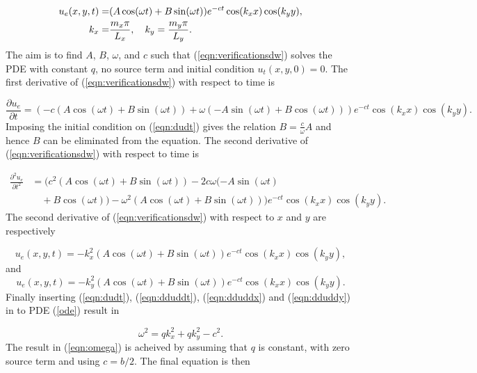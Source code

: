 \documentclass[twoside]{article}
\begin{document}
\begin{align}\label{eqn:verificationsdw} 
 u_e(x, y, t) =& (A\cos(\omega t) + B\sin(\omega t))e^{-ct}\cos(k_x x)\cos(k_y y), \\ \notag
 k_x =& \frac{m_x\pi}{L_x}, \quad k_y=\frac{m_y \pi}{L_y}.
\end{align}
The aim is to find $A$, $B$, $\omega$, and $c$ such that (\ref{eqn:verificationsdw}) solves the PDE with constant $q$, no source term and initial condition $u_t(x,y,0)=0$. The first derivative of (\ref{eqn:verificationsdw}) with respect to time is

\begin{equation}
 \frac{\partial u_e}{\partial t} = (-c(A\cos(\omega t)+B\sin(\omega t)) + \omega (-A\sin(\omega t) + B\cos(\omega t))) e^{-ct} \cos (k_x x) \cos(k_y y).
\label{eqn:dudt}
\end{equation}
Imposing the initial condition on (\ref{eqn:dudt}) gives the relation $B=\frac{c}{\omega}A$ and hence $B$ can be eliminated from the equation. The second derivative of (\ref{eqn:verificationsdw}) with respect to time is

\begin{align}
 \frac{\partial^2 u_e}{\partial t^2} &= (c^2(A\cos(\omega t)+B\sin(\omega t)) - 2 c \omega     (-A\sin(\omega t)\\
         & \quad+ B\cos(\omega t)) - \omega^2 (A\cos (\omega t) + B\sin(\omega t))) e^{-ct} \cos (k_x x) \cos(k_y y).
\label{eqn:dduddt}
\end{align}
The second derivative of (\ref{eqn:verificationsdw}) with respect to $x$ and $y$ are respectively

\begin{equation}
 u_e(x, y, t) = -k_x^2 (A\cos(\omega t) + B\sin(\omega t))e^{-ct}\cos(k_x x)\cos(k_y y),
\label{eqn:dduddx}
\end{equation}
and 
\begin{equation}
 u_e(x, y, t) = -k_y^2(A\cos(\omega t) + B\sin(\omega t))e^{-ct}\cos(k_x x)\cos(k_y y).
\label{eqn:dduddy}
\end{equation}
Finally inserting (\ref{eqn:dudt}), (\ref{eqn:dduddt}), (\ref{eqn:dduddx}) and (\ref{eqn:dduddy}) in to PDE (\ref{ode}) result in

\begin{equation}
 \omega^2 = q k_x^2 + qk_y^2 - c^2.
\label{eqn:omega}
\end{equation}
The result in (\ref{eqn:omega}) is acheived by assuming that $q$ is constant, with zero source term and using $c = b/2$. The final equation is then
\end{document}
